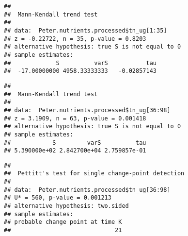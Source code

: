 \documentclass[]{article}
\newenvironment{Shaded}{\begin{snugshade}}{\end{snugshade}}
\newcommand{\KeywordTok}[1]{\textcolor[rgb]{0.13,0.29,0.53}{\textbf{#1}}}
\newcommand{\DecValTok}[1]{\textcolor[rgb]{0.00,0.00,0.81}{#1}}
\newcommand{\CommentTok}[1]{\textcolor[rgb]{0.56,0.35,0.01}{\textit{#1}}}
\newcommand{\OperatorTok}[1]{\textcolor[rgb]{0.81,0.36,0.00}{\textbf{#1}}}
\newcommand{\NormalTok}[1]{#1}
\begin{document}
\begin{verbatim}
## 
##  Mann-Kendall trend test
## 
## data:  Peter.nutrients.processed$tn_ug[1:35]
## z = -0.22722, n = 35, p-value = 0.8203
## alternative hypothesis: true S is not equal to 0
## sample estimates:
##             S          varS           tau 
##  -17.00000000 4958.33333333   -0.02857143
\end{verbatim}

\begin{Shaded}
\end{Shaded}

\begin{verbatim}
## 
##  Mann-Kendall trend test
## 
## data:  Peter.nutrients.processed$tn_ug[36:98]
## z = 3.1909, n = 63, p-value = 0.001418
## alternative hypothesis: true S is not equal to 0
## sample estimates:
##            S         varS          tau 
## 5.390000e+02 2.842700e+04 2.759857e-01
\end{verbatim}

\begin{Shaded}
\end{Shaded}

\begin{verbatim}
## 
##  Pettitt's test for single change-point detection
## 
## data:  Peter.nutrients.processed$tn_ug[36:98]
## U* = 560, p-value = 0.001213
## alternative hypothesis: two.sided
## sample estimates:
## probable change point at time K 
##                              21
\end{verbatim}

\begin{Shaded}
\end{Shaded}
\end{document}
